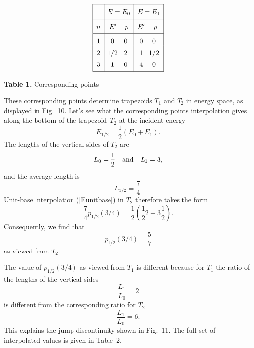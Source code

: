 \documentclass[11pt]{article}
\begin{document}
\begin{table}
$$
\vbox{
  \offinterlineskip
  \hrule
  \tabskip=0pt
  \halign{    %
    \vrule height 14pt depth 3pt #      \tabskip=5pt &
    \hfil #\hfil&                       %
    \vrule #&
    \hfil$#$\hfil  &               %
    \hfil$#$\hfil  &               %
    \vrule #&
    \hfil$#$\hfil  &               %
    \hfil$#$\hfil  &               %
    \vrule #              \tabskip=0pt  \cr  %
   depth 7pt &&& \multispan{2}\hfil$E = E_0$\hfil&&
        \multispan{2}\hfil$E = E_1$\hfil&\cr
   \noalign{\hrule}
   depth 7pt & $n$&& \hfil E'&  \hfil p &&
                  \hfil E'&  \hfil p & \cr
   \noalign{\hrule}
    & 1&& 0 & 0&& 0 & 0& \cr  %
    & 2&& 1/2 & 2&& 1 & 1/2& \cr %
 depth 7pt   & 3&& 1 & 0&& 4 & 0& \cr %
   \noalign{\hrule}
  }
}
$$
\vglue 10pt
\centerline{{\bf Table 1.}  Corresponding points}
\end{table}

These corresponding points determine trapezoids $T_1$ and $T_2$ in
energy space, as displayed in Fig.~10.  Let's see what the
corresponding points interpolation gives along the bottom of the
trapezoid~$T_2$ at the incident energy
\[
  E_{1/2} = \frac{1}{2}
   (E_0 + E_1).
\]
The lengths of the vertical sides of $T_2$ are
\[
  L_0 = \frac{1}{2} \quad \hbox{and} \quad
  L_1 = 3,
\]
and the average length is
\[
  L_{1/2} = \frac{7}{4}.
\]
Unit-base interpolation (\ref{Eunitbase}) in $T_2$ therefore takes 
the form
\[
   \frac{7}{4} p_{1/2}(3/4) =
     \frac{1}{2} \left(
       \frac{1}{2}2 + 3\frac{1}{2}
     \right).
\]
Consequently, we find that
\[
  p_{1/2}(3/4) = \frac{5}{7}
\]
as viewed from $T_2$.

The value of $p_{1/2}(3/4)$ as viewed from $T_1$ is different
because for $T_1$ the ratio of the lengths of the vertical sides
\[
  \frac{L_1}{L_0} = 2
\]
is different from the corresponding ratio for $T_2$
\[
  \frac{L_1}{L_0} = 6.
\]
This explains the jump discontinuity shown in Fig.~11.
The full set of interpolated values is given in Table~2.

\begin{figure}

\end{figure}
\end{document}
